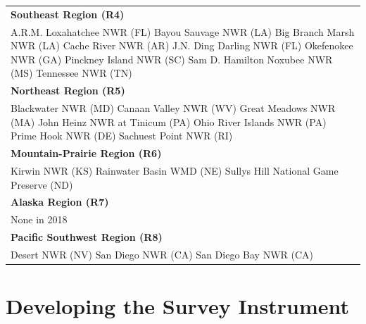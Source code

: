 \documentclass[]{book}
\begin{document}
\begin{longtable}[]{@{}l@{}}
\begin{minipage}[t]{0.05\columnwidth}
\textbf{Southeast Region (R4)}\strut
\end{minipage}\tabularnewline
\begin{minipage}[t]{0.05\columnwidth}\raggedright\strut
A.R.M. Loxahatchee NWR (FL) Bayou Sauvage NWR (LA) Big Branch Marsh NWR
(LA) Cache River NWR (AR) J.N. Ding Darling NWR (FL) Okefenokee NWR (GA)
Pinckney Island NWR (SC) Sam D. Hamilton Noxubee NWR (MS) Tennessee NWR
(TN)\strut
\end{minipage}\tabularnewline
\begin{minipage}[t]{0.05\columnwidth}\raggedright\strut
\textbf{Northeast Region (R5)}\strut
\end{minipage}\tabularnewline
\begin{minipage}[t]{0.05\columnwidth}\raggedright\strut
Blackwater NWR (MD) Canaan Valley NWR (WV) Great Meadows NWR (MA) John
Heinz NWR at Tinicum (PA) Ohio River Islands NWR (PA) Prime Hook NWR
(DE) Sachuest Point NWR (RI)\strut
\end{minipage}\tabularnewline
\begin{minipage}[t]{0.05\columnwidth}\raggedright\strut
\textbf{Mountain-Prairie Region (R6)}\strut
\end{minipage}\tabularnewline
\begin{minipage}[t]{0.05\columnwidth}\raggedright\strut
Kirwin NWR (KS) Rainwater Basin WMD (NE) Sullys Hill National Game
Preserve (ND)\strut
\end{minipage}\tabularnewline
\begin{minipage}[t]{0.05\columnwidth}\raggedright\strut
\textbf{Alaska Region (R7)}\strut
\end{minipage}\tabularnewline
\begin{minipage}[t]{0.05\columnwidth}\raggedright\strut
None in 2018\strut
\end{minipage}\tabularnewline
\begin{minipage}[t]{0.05\columnwidth}\raggedright\strut
\textbf{Pacific Southwest Region (R8)}\strut
\end{minipage}\tabularnewline
\begin{minipage}[t]{0.05\columnwidth}\raggedright\strut
Desert NWR (NV) San Diego NWR (CA) San Diego Bay NWR (CA)\strut
\end{minipage}\tabularnewline
\bottomrule
\end{longtable}

\section*{Developing the Survey
Instrument}\label{developing-the-survey-instrument}
\end{document}
